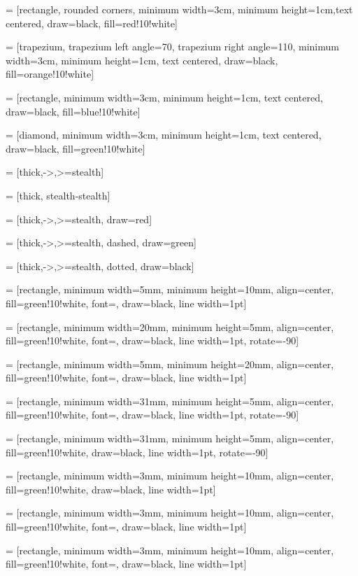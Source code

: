  = [rectangle, rounded corners, minimum width=3cm, minimum height=1cm,text centered, draw=black, fill=red!10!white]

 = [trapezium, trapezium left angle=70, trapezium right angle=110, minimum width=3cm, minimum height=1cm, text centered, draw=black, fill=orange!10!white]

 = [rectangle, minimum width=3cm, minimum height=1cm, text centered, draw=black, fill=blue!10!white]

 = [diamond, minimum width=3cm, minimum height=1cm, text centered, draw=black, fill=green!10!white]

 = [thick,->,>=stealth]

 = [thick, stealth-stealth]

  = [thick,->,>=stealth, draw=red]

  = [thick,->,>=stealth, dashed, draw=green]

  = [thick,->,>=stealth, dotted, draw=black]

 = [rectangle, minimum width=5mm, minimum height=10mm, align=center, fill=green!10!white, font=\footnotesize, draw=black, line width=1pt]

 = [rectangle, minimum width=20mm, minimum height=5mm, align=center, fill=green!10!white, font=\scriptsize, draw=black, line width=1pt, rotate=-90]

 = [rectangle, minimum width=5mm, minimum height=20mm, align=center, fill=green!10!white, font=\scriptsize, draw=black, line width=1pt]

 = [rectangle, minimum width=31mm, minimum height=5mm, align=center, fill=green!10!white, font=\small, draw=black, line width=1pt, rotate=-90]

 = [rectangle, minimum width=31mm, minimum height=5mm, align=center, fill=green!10!white, draw=black, line width=1pt, rotate=-90]

 = [rectangle, minimum width=3mm, minimum height=10mm, align=center, fill=green!10!white, draw=black, line width=1pt]

 = [rectangle, minimum width=3mm, minimum height=10mm, align=center, fill=green!10!white, font=\small, draw=black, line width=1pt]

 = [rectangle, minimum width=3mm, minimum height=10mm, align=center, fill=green!10!white, font=\footnotesize, draw=black, line width=1pt]

